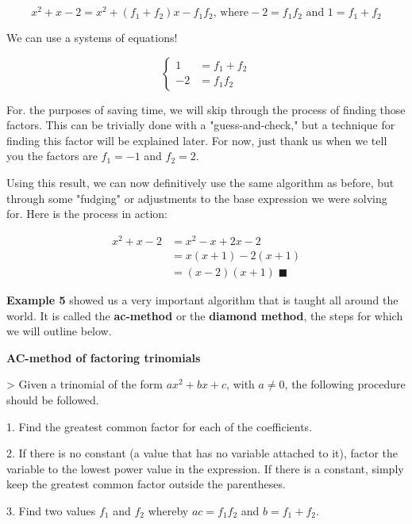 $$x^{2}+x-2=x^{2}+(f _{1}+f _{2})x-f _{1}f _{2} \text{, where} -2=f _{1}f _{2} \text{ and } 1=f _{1}+f _{2}$$



We can use a systems of equations!



$$\begin{cases} 1 & =f _{1}+f _{2} \\ -2 & =f _{1}f _{2} \end{cases}$$



For. the purposes of saving time, we will skip through the process of finding those
factors. This can be trivially done with a "guess-and-check," but a technique for finding
this factor will be explained later. For now, just thank us when we tell you the factors
are $f _{1}=-1$ and $f _{2}=2$.



Using this result, we can now definitively use the same algorithm as before, but through
some "fudging" or adjustments to the base expression we were solving for. Here is the
process in action:



\[
\begin{aligned}
x^{2}+x-2 
&= x^{2}-x+2x-2 \\
&= x(x+1)-2(x+1) \\
&= (x-2)(x+1) \;\blacksquare
\end{aligned}
\]


\textbf{Example 5} showed us a very important algorithm that is taught all around the world. It is called the \textbf{ac-method} or the \textbf{diamond method}, the steps for which we will outline below.



\textbf{AC-method of factoring trinomials}



> Given a trinomial of the form $ax^{2}+bx+c$, with $a\ne0$, the following procedure
should be followed.

    1.  Find the greatest common factor for each of the coefficients.

    2.  If there is no constant (a value that has no variable attached to it), factor the
    variable to the lowest power value in the expression. If there is a constant, simply
    keep the greatest common factor outside the parentheses.

    3.  Find two values $f _{1}$ and $f _{2}$ whereby $ac=f _{1}f _{2}$ and $b=f _{1}+f _{2}$.


